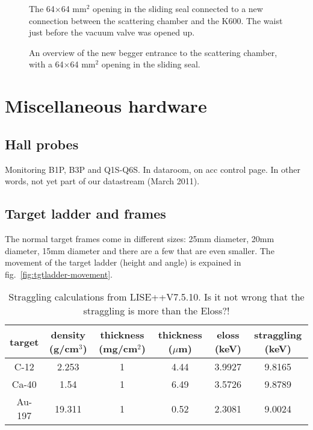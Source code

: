 \documentclass[11pt]{report}
\begin{document}
\begin{figure}[!ht]
\centerline{\vspace{0cm}\hspace{0cm}
}
\centering
\caption{The 64$\times$64 mm$^2$ opening in the sliding seal connected to a new connection 
between the scattering chamber and the K600. The waist just before the vacuum valve was opened up.  }
\label{fig:scatchamber-exit-new}
\end{figure} 


\begin{figure}[!ht]
\centerline{\vspace{0cm}\hspace{0cm}
}
\centering
\caption{An overview of the new begger entrance to the scattering chamber, with a 64$\times$64 mm$^2$
opening in the sliding seal.}
\label{fig:scatchamber-entry-new}
\end{figure} 



\clearpage




\chapter{Miscellaneous hardware}

\section{Hall probes}
Monitoring B1P, B3P and Q1S-Q6S.
In dataroom, on acc control page. In other words, not yet part of 
our datastream (March 2011).


\section{Target ladder and frames}

The normal target frames come in different sizes:
25mm diameter, 20mm diameter, 15mm diameter and there are a few that are even smaller.
The movement of the target ladder (height and angle) 
is expained in fig.~\ref{fig:tgtladder-movement}.

\begin{table}[!ht]
\centering
\begin{tabular}{|c|c|c|c|c|c|}
\hline
target & density (g/cm$^3$) & thickness (mg/cm$^2$) & thickness ($\mu$m) & eloss (keV) & straggling (keV)\\ 
\hline
\hline
C-12   & 2.253  & 1  & 4.44  & 3.9927 & 9.8165 \\
Ca-40  & 1.54   & 1  & 6.49  & 3.5726 & 9.8789 \\
Au-197 & 19.311 & 1  & 0.52  & 2.3081 & 9.0024 \\
\hline
\end{tabular}
\caption{Straggling calculations from LISE++V7.5.10. Is it not wrong that the straggling is more than the
Eloss?!}
\label{table:straggling}
\end{table}
\end{document}
